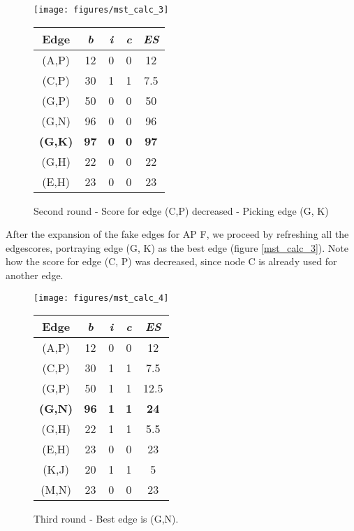 	\begin{figure}[h!]
	  \centering
	  \begin{minipage}{7.5cm}
	    \texttt{[image: figures/mst\_calc\_3]}
	  \end{minipage}
	  \begin{minipage}{4cm}
	    \begin{tabular}{c||c|c|c||c}
	      Edge & \textit{b} & \textit{i} & \textit{c} & \textit{ES}\\ \hline\hline
	      (A,P) & 12 & 0 & 0 & 12 \\ \hline
	      (C,P) & 30 & 1 & 1 & 7.5 \\ \hline
	      (G,P) & 50 & 0 & 0 & 50 \\ \hline
	      (G,N) & 96 & 0 & 0 & 96 \\ \hline
	      \textbf{(G,K)} & \textbf{97} & \textbf{0} & \textbf{0} & \textbf{97} \\ \hline
	      (G,H) & 22 & 0 & 0 & 22 \\ \hline
	      (E,H) & 23 & 0 & 0 & 23 \\ \hline
	    \end{tabular}
	  \end{minipage}
	\caption{Second round - Score for edge (C,P) decreased - Picking edge (G, K)}
	\label{fig:mst_calc_3}
      \end{figure}

      After the expansion of the fake edges for \ac{AP} F, we proceed by refreshing all the edgescores, 
      portraying edge (G, K) as the best edge (figure \ref{mst_calc_3}).
      Note how the score for edge (C, P) was decreased, since node C is already used for another edge.
      
      \begin{figure}[h!]
	\centering
	\begin{minipage}{7.5cm}
	  \texttt{[image: figures/mst\_calc\_4]}
	\end{minipage}
	\begin{minipage}{4cm}
	  \begin{tabular}{c||c|c|c||c}
	    Edge & \textit{b} & \textit{i} & \textit{c} & \textit{ES}\\ \hline\hline
	    (A,P) & 12 & 0 & 0 & 12 \\ \hline
	    (C,P) & 30 & 1 & 1 & 7.5 \\ \hline
	    (G,P) & 50 & 1 & 1 & 12.5 \\ \hline
	    \textbf{(G,N)} & \textbf{96} & \textbf{1} & \textbf{1} & \textbf{24} \\ \hline
	    (G,H) & 22 & 1 & 1 & 5.5 \\ \hline
	    (E,H) & 23 & 0 & 0 & 23 \\ \hline
	    (K,J) & 20 & 1 & 1 & 5 \\ \hline
	    (M,N) & 23 & 0 & 0 & 23 \\ \hline
	  \end{tabular}
	\end{minipage}
	\caption{Third round - Best edge is (G,N).}
	\label{fig:mst_calc_4}
      \end{figure}
      
